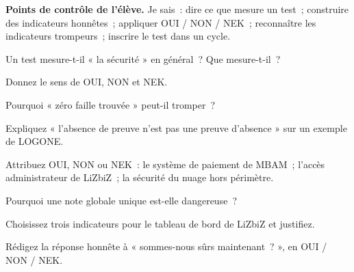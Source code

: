 \begin{boxinfo}
\textbf{Points de contrôle de l'élève.} Je sais~: dire ce que mesure un
test~; construire des indicateurs honnêtes~; appliquer OUI / NON / NEK~;
reconnaître les indicateurs trompeurs~; inscrire le test dans un cycle.
\end{boxinfo}

\bigskip

\begin{boxexo}[title={\ding{45}\quad Exercice~26.1. Ce que mesure un test \niveaubase}]
Un test mesure-t-il « la sécurité » en général~? Que mesure-t-il~?
\end{boxexo}

\begin{boxexo}[title={\ding{45}\quad Exercice~26.2. Trois valeurs \niveaubase}]
Donnez le sens de OUI, NON et NEK.
\end{boxexo}

\begin{boxexo}[title={\ding{45}\quad Exercice~26.3. Trompeur \niveaubase}]
Pourquoi « zéro faille trouvée » peut-il tromper~?
\end{boxexo}

\begin{boxexo}[title={\ding{45}\quad Exercice~26.4. Absence de preuve \niveaumoyen}]
Expliquez « l'absence de preuve n'est pas une preuve d'absence » sur un
exemple de LOGONE.
\end{boxexo}

\begin{boxexo}[title={\ding{45}\quad Exercice~26.5. Classer \niveaumoyen}]
Attribuez OUI, NON ou NEK~: le système de paiement de MBAM~; l'accès
administrateur de LiZbiZ~; la sécurité du nuage hors périmètre.
\end{boxexo}

\begin{boxexo}[title={\ding{45}\quad Exercice~26.6. Note unique \niveaumoyen}]
Pourquoi une note globale unique est-elle dangereuse~?
\end{boxexo}

\begin{boxexo}[title={\ding{45}\quad Exercice~26.7. Indicateurs \niveaumoyen}]
Choisissez trois indicateurs pour le tableau de bord de LiZbiZ et justifiez.
\end{boxexo}

\begin{boxexo}[title={\ding{45}\quad Exercice~26.8. Répondre au DG \niveaumoyen}]
Rédigez la réponse honnête à « sommes-nous sûrs maintenant~? », en OUI / NON
/ NEK.
\end{boxexo}

